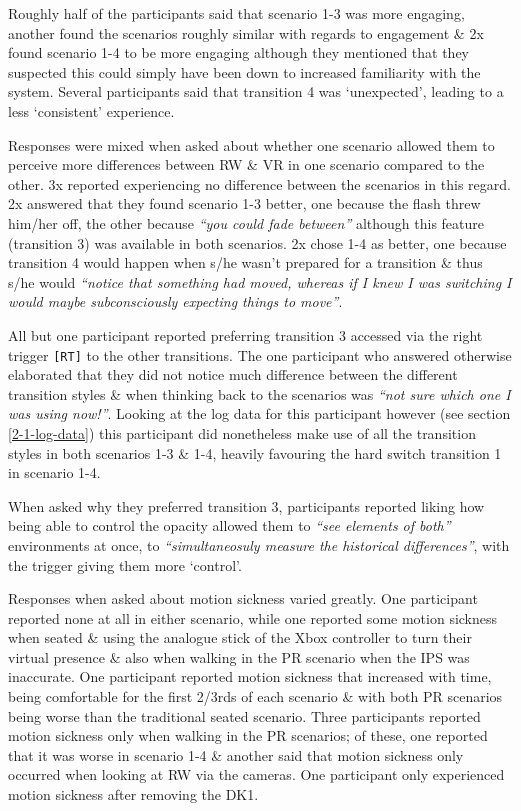 Roughly half of the participants said that scenario 1-3 was more engaging, another found the scenarios roughly similar with regards to engagement \& 2x found scenario 1-4 to be more engaging although they mentioned that they suspected this could simply have been down to increased familiarity with the system. Several participants said that transition 4 was `unexpected', leading to a less `consistent' experience.

Responses were mixed when asked about whether one scenario allowed them to perceive more differences between RW \& VR in one scenario compared to the other. 3x reported experiencing no difference between the scenarios in this regard. 2x answered that they found scenario 1-3 better, one because the flash threw him/her off, the other because \textit{``you could fade between''}  although this feature (transition 3) was available in both scenarios. 2x chose 1-4 as better, one because transition 4 would happen when s/he wasn't prepared for a transition \& thus s/he would \textit{``notice that something had moved, whereas if I knew I was switching I would maybe subconsciously expecting things to move''}.

All but one participant reported preferring transition 3 accessed via the right trigger \texttt{[RT]} to the other transitions. The one participant who answered otherwise elaborated that they did not notice much difference between the different transition styles \& when thinking back to the scenarios was \textit{``not sure which one I was using now!''}. Looking at the log data for this participant however (see section \ref{2-1-log-data}) this participant did nonetheless make use of all the transition styles in both scenarios 1-3 \& 1-4, heavily favouring the hard switch transition 1 in scenario 1-4.

When asked why they preferred transition 3, participants reported liking how being able to control the opacity allowed them to \textit{``see elements of both''} environments at once, to \textit{``simultaneosuly measure the historical differences''}, with the trigger giving them more `control'.

Responses when asked about motion sickness varied greatly. One participant reported none at all in either scenario, while one reported some motion sickness when seated \& using the analogue stick of the Xbox controller to turn their virtual presence \& also when walking in the PR scenario when the IPS was inaccurate. One participant reported motion sickness that increased with time, being comfortable for the first 2/3rds of each scenario \& with both PR scenarios being worse than the traditional seated scenario. Three participants reported motion sickness only when walking in the PR scenarios; of these, one reported that it was worse in scenario 1-4 \& another said that motion sickness only occurred when looking at RW via the cameras. One participant only experienced motion sickness after removing the DK1.

